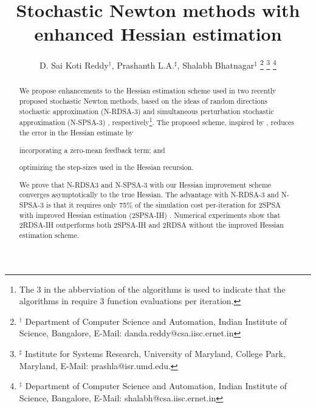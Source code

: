 \documentclass[twocolumn]{IEEEtran}
\begin{document}
\title{\LARGE \bf
Stochastic Newton methods with enhanced Hessian estimation
}



\author{D. Sai Koti Reddy$^\dagger$, Prashanth L.A.$^\sharp$, Shalabh Bhatnagar$^\ddag$
\thanks{
$^\dagger$ Department of Computer Science and Automation,
Indian Institute of Science, Bangalore,
E-Mail: danda.reddy@csa.iisc.ernet.in}
\thanks{
$^\sharp$ Institute for Systems Research, University of Maryland, College Park, Maryland,
E-Mail: prashla@isr.umd.edu.
}
\thanks{
$^\ddag$ Department of Computer Science and Automation,
Indian Institute of Science, Bangalore,
E-Mail: shalabh@csa.iisc.ernet.in
}
}

\maketitle

\begin{abstract}
We propose enhancements to the Hessian estimation scheme used in two recently proposed stochastic Newton methods, based on the ideas of random directions stochastic approximation (N-RDSA-3) \cite{prashanth2015rdsa} and simultaneous perturbation stochastic approximation (N-SPSA-3) \cite{bhatnagar2015simultaneous}, respectively\footnote{The 3 in the abberviation of the algorithms is used to indicate that the algorithms in \cite{prashanth2015rdsa,bhatnagar2015simultaneous} require 3 function evaluations per iteration.}. The proposed scheme, inspired by \cite{spall-jacobian}, reduces the error in the Hessian estimate by 
\begin{inparaenum}[\bfseries (i)]
	\item incorporating a zero-mean feedback term; and
	\item optimizing the step-sizes used in the Hessian recursion.
\end{inparaenum}
We prove that N-RDSA3 and N-SPSA-3 with our Hessian improvement scheme converges asymptotically to the true Hessian.
The advantage with N-RDSA-3 and N-SPSA-3  is that it requires only 75\% of the simulation cost per-iteration for 2SPSA with improved Hessian estimation (2SPSA-IH) \cite{spall-jacobian}.
Numerical experiments show that 2RDSA-IH outperforms both 2SPSA-IH and 2RDSA without the improved Hessian estimation scheme.
\end{abstract}
\end{document}

